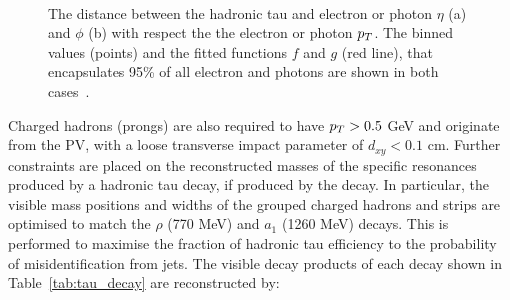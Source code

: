 \begin{figure}[!hbtp]
\centering
     \\
\caption{The distance between the hadronic tau and electron or photon $\eta$ (a) and $\phi$ (b) with respect the the electron or photon $p_{T}$. The binned values (points) and the fitted functions $f$ and $g$ (red line), that encapsulates 95\% of all electron and photons are shown in both cases~\cite{Sirunyan:2018pgf}.}
\label{fig:hps}
\end{figure}

Charged hadrons (prongs) are also required to have $p_{T} > 0.5$ GeV and originate from the \ac{PV}, with a loose transverse impact parameter of $d_{xy} < 0.1$ cm.
Further constraints are placed on the reconstructed masses of the specific resonances produced by a hadronic tau decay, if produced by the decay.
In particular, the visible mass positions and widths of the grouped charged hadrons and strips are optimised to match the $\rho$ (770 MeV) and $a_1$ (1260 MeV) decays.
This is performed to maximise the fraction of hadronic tau efficiency to the probability of misidentification from jets.
The visible decay products of each decay shown in Table~\ref{tab:tau_decay} are reconstructed by:

